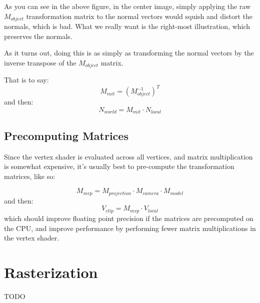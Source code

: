 \documentclass[12pt,letterpaper]{article}
\begin{document}
As you can see in the above figure, in the center image, simply applying the raw $M_{object}$ transformation 
matrix to the normal vectors would squish and distort the normals, which is bad. What we really want is the right-most illustration, 
which preserves the normals.

As it turns out, doing this is as simply as transforming the normal vectors by the inverse transpose of the $M_{object}$ matrix.

That is to say:
$$
M_{mit} = {\left(M_{object}^{-1}\right)}^T
$$
and then:
$$
N_{world} = M_{mit} \cdot N_{local}
$$

\subsection{Precomputing Matrices}

Since the vertex shader is evaluated across all vertices, and matrix multiplication is somewhat expensive, 
it's usually best to pre-compute the transformation matrices, like so:

$$
M_{mvp} = M_{projection} \cdot M_{camera} \cdot M_{model}
$$
and then:
$$
V_{clip} = M_{mvp} \cdot V_{local}
$$
which should improve floating point precision if the matrices are precomputed on the CPU, 
and improve performance by performing fewer matrix multiplications in the vertex shader.

\section{Rasterization}

TODO
\end{document}
